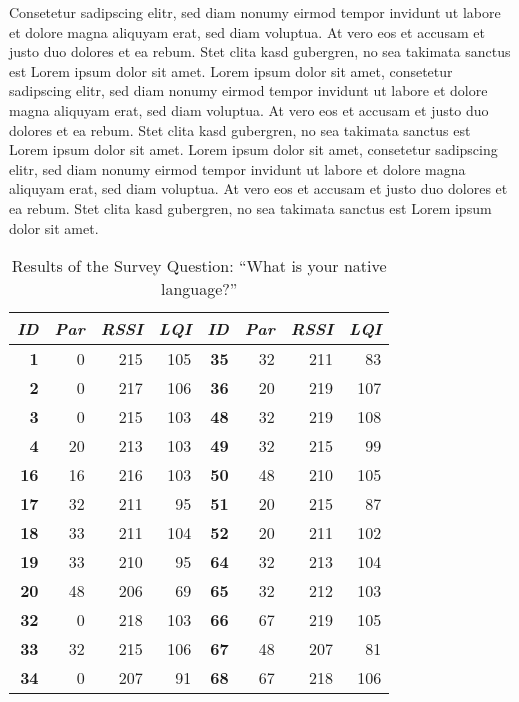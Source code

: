 Consetetur sadipscing elitr,  sed diam nonumy eirmod tempor invidunt ut labore
et dolore magna aliquyam erat, sed diam voluptua. At vero eos et accusam et
justo duo dolores et ea rebum. Stet clita kasd gubergren, no sea takimata
sanctus est Lorem ipsum dolor sit amet. Lorem ipsum dolor sit amet, consetetur
sadipscing elitr,  sed diam nonumy eirmod tempor invidunt ut labore et dolore
magna aliquyam erat, sed diam voluptua. At vero eos et accusam et justo duo
dolores et ea rebum. Stet clita kasd gubergren, no sea takimata sanctus est
Lorem ipsum dolor sit amet. Lorem ipsum dolor sit amet, consetetur sadipscing
elitr,  sed diam nonumy eirmod tempor invidunt ut labore et dolore magna
aliquyam erat, sed diam voluptua. At vero eos et accusam et justo duo dolores
et ea rebum. Stet clita kasd gubergren, no sea takimata sanctus est Lorem ipsum
dolor sit amet.

\begin{table}
\begin{center}
\begin{tabular}{|r|r|r|r||r|r|r|r|}
\hline \textbf{\textit{ID}} & \textbf{\textit{Par}} & \textbf{\textit{RSSI}} &
\textbf{\textit{LQI}} &
\textbf{\textit{ID}} & \textbf{\textit{Par}} & \textbf{\textit{RSSI}} & \textbf{\textit{LQI}} \\
\hline \hline
\textbf{1}  &  0 & 215 & 105 & \textbf{35} & 32 & 211 &  83 \\
\textbf{2}  &  0 & 217 & 106 & \textbf{36} & 20 & 219 & 107 \\
\textbf{3}  &  0 & 215 & 103 & \textbf{48} & 32 & 219 & 108 \\
\textbf{4}  & 20 & 213 & 103 & \textbf{49} & 32 & 215 &  99 \\
\textbf{16} & 16 & 216 & 103 & \textbf{50} & 48 & 210 & 105 \\
\textbf{17} & 32 & 211 &  95 & \textbf{51} & 20 & 215 &  87 \\
\textbf{18} & 33 & 211 & 104 & \textbf{52} & 20 & 211 & 102 \\
\textbf{19} & 33 & 210 &  95 & \textbf{64} & 32 & 213 & 104 \\
\textbf{20} & 48 & 206 &  69 & \textbf{65} & 32 & 212 & 103 \\
\textbf{32} &  0 & 218 & 103 & \textbf{66} & 67 & 219 & 105 \\
\textbf{33} & 32 & 215 & 106 & \textbf{67} & 48 & 207 &  81 \\
\textbf{34} &  0 & 207 &  91 & \textbf{68} & 67 & 218 & 106 \\
\hline
\end{tabular}
\caption{Results of the Survey Question: ``What is your native language?''}
\end{center}
\end{table}

